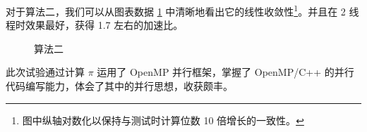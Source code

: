 \documentclass{zjureport-zh}
\begin{document}
\par 对于算法二，我们可以从图表数据 \ref{fig2} 中清晰地看出它的线性收敛性\footnote{图中纵轴对数化以保持与测试时计算位数 10 倍增长的一致性。}。并且在 2 线程时效果最好，获得 1.7 左右的加速比。

\begin{figure}[h] \label{fig2}
	\centering
	\caption{算法二}
\end{figure}

\par 此次试验通过计算 $\pi$ 运用了 OpenMP 并行框架，掌握了 OpenMP/C++ 的并行代码编写能力，体会了其中的并行思想，收获颇丰。



\end{document}
